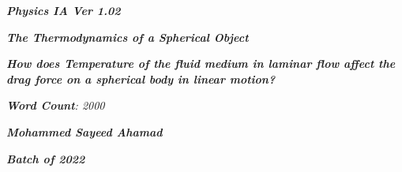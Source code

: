

\begin{titlepage}
    \begin{center}
        \vspace*{1cm}
            
        \date{}
            
        \huge
            
        \textit{\textbf{Physics IA Ver 1.02}}
            
        \vspace{0.25cm}
            
        \hline
            
        \vspace{2.5cm}
            
        \textit{\textbf{The Thermodynamics of a Spherical Object}}
            
        \vspace{1cm}
            
        \LARGE
            
        \textit{\textbf{How does Temperature of the fluid medium in laminar flow affect the drag force on a spherical body in linear motion? }}
            
        \vspace{2.5cm}
            
        \Large
            
		\textit{\textbf{Word Count}: 2000}            

		\vspace{1cm}            
            
		\Large		
		            
        \textit{\textbf{Mohammed Sayeed Ahamad}}
            
        \vspace{2cm}
            
        \Large
            
        \textit{\textbf{Batch of 2022}}
            
        \vspace{0.25cm}
            
        \hline
           
            
    \end{center}
\end{titlepage}





